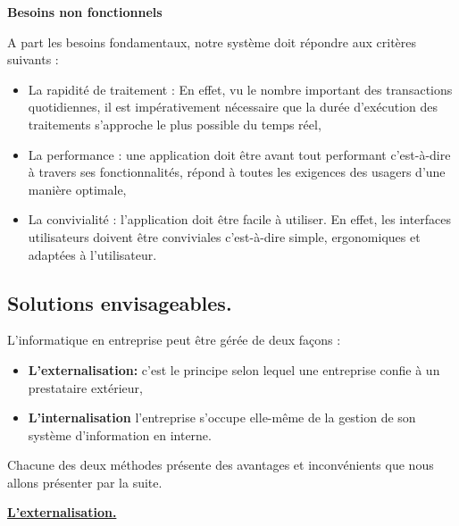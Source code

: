 \textbf{Besoins non fonctionnels}


A part les besoins fondamentaux, notre système doit répondre aux critères suivants :


\begin{itemize}[label=\textbullet, font=\LARGE \color{blue}] 
	\item La rapidité de traitement : En effet, vu le nombre important des transactions quotidiennes, il est impérativement nécessaire que la durée d’exécution des traitements s’approche le plus possible du temps réel,
	\item  La performance : une application doit être avant tout performant c’est-à-dire à travers ses fonctionnalités, répond à toutes les exigences des usagers d’une manière optimale,
	\item  La convivialité : l’application doit être facile à utiliser. En effet, les interfaces utilisateurs doivent être conviviales c’est-à-dire simple, ergonomiques et adaptées à l’utilisateur.
	
\end{itemize}

\subsection{Solutions envisageables.}

L’informatique en entreprise peut être gérée de deux façons :

\begin{itemize}[label=\textbullet, font=\LARGE \color{blue}]
	\item  \textbf{L’externalisation:} c’est le principe selon lequel une entreprise confie à un prestataire extérieur, 	
	\item  \textbf{L’internalisation }  l’entreprise s’occupe elle-même de la gestion de son système d’information en interne.
\end{itemize}

Chacune des deux méthodes présente des avantages et inconvénients que nous allons présenter par la suite.

\textbf{\underline{L'externalisation.}}

